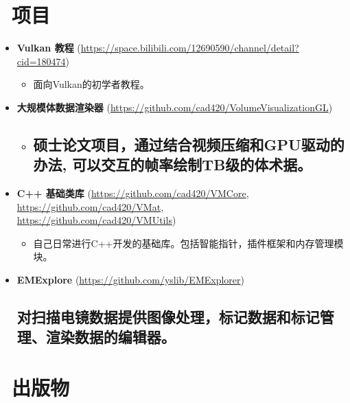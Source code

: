 \documentclass{resume}
\begin{document}
\section{\faUsers\ 项目}

\begin{itemize}

\item \textbf{Vulkan 教程} (\url{https://space.bilibili.com/12690590/channel/detail?cid=180474})

\begin{itemize}
  \item 面向Vulkan的初学者教程。
\end{itemize}


\item \textbf{大规模体数据渲染器} (\url{https://github.com/cad420/VolumeVisualizationGL})

\begin{itemize}
  \item
  \subsection{硕士论文项目，通过结合视频压缩和GPU驱动的办法, 可以交互的帧率绘制TB级的体术据。}
\end{itemize}


\item \textbf{C++ 基础类库} (\url{https://github.com/cad420/VMCore}, \url{https://github.com/cad420/VMat},\\
 \url{https://github.com/cad420/VMUtils})

\begin{itemize}

\item 自己日常进行C++开发的基础库。包括智能指针，插件框架和内存管理模块。
\end{itemize}

\item \textbf{EMExplore} (\url{https://github.com/yslib/EMExplorer})

\subsection{
  对扫描电镜数据提供图像处理，标记数据和标记管理、渲染数据的编辑器。
}

\end{itemize}

\section{\faUsers\ 出版物}
\end{document}
